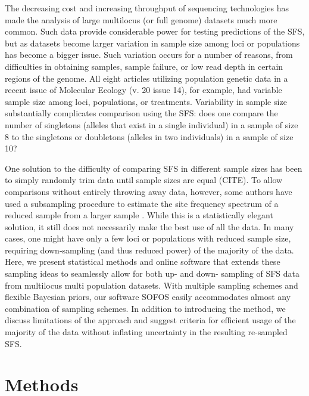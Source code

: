 \documentclass[11pt,letterpaper]{article}
\begin{document}
The decreasing cost and increasing throughput of sequencing technologies has made the analysis of large multilocus (or full genome) datasets much more common.  Such data provide considerable power for testing predictions of the SFS, but as datasets become larger variation in sample size among loci or populations has become a bigger issue.  Such variation occurs for a number of reasons, from difficulties in obtaining samples, sample failure, or low read depth in certain regions of the genome.  All eight articles utilizing population genetic data in a recent issue of Molecular Ecology (v. 20 issue 14), for example, had variable sample size among loci, populations, or treatments.  Variability in sample size substantially complicates comparison using the SFS:  does one compare the number of singletons (alleles that exist in a single individual) in a sample of size 8 to the singletons or doubletons (alleles in two individuals) in a sample of size 10?

One solution to the difficulty of comparing SFS in different sample sizes has been to simply randomly trim data until sample sizes are equal (CITE).  To allow comparisons without entirely throwing away data, however, some authors have used a subsampling procedure to estimate the site frequency spectrum of a reduced sample from a larger sample \citep{Nielsen2005}.  While this is a statistically elegant solution, it still does not necessarily make the best use of all the data.  In many cases, one might have only a few loci or populations with reduced sample size, requiring down-sampling (and thus reduced power) of the majority of the data.  Here, we present statistical methods and online software that extends these sampling ideas to seamlessly allow for both up- and down- sampling of SFS data from multilocus multi population datasets.  With multiple sampling schemes and flexible Bayesian priors, our software SOFOS easily accommodates almost any combination of sampling schemes.  In addition to introducing the method, we discuss limitations of the approach and suggest criteria for efficient usage of the majority of the data without inflating uncertainty in the resulting re-sampled SFS.


\section{Methods}
\end{document}
